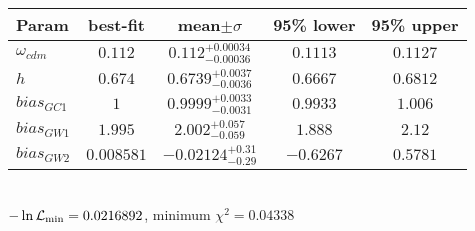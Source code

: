 \begin{tabular}{|l|c|c|c|c|} 
 \hline 
Param & best-fit & mean$\pm\sigma$ & 95\% lower & 95\% upper \\ \hline 
$\omega_{cdm }$ &$0.112$ & $0.112_{-0.00036}^{+0.00034}$ & $0.1113$ & $0.1127$ \\ 
$h$ &$0.674$ & $0.6739_{-0.0036}^{+0.0037}$ & $0.6667$ & $0.6812$ \\ 
$bias_{GC 1 }$ &$1$ & $0.9999_{-0.0031}^{+0.0033}$ & $0.9933$ & $1.006$ \\ 
$bias_{GW 1 }$ &$1.995$ & $2.002_{-0.059}^{+0.057}$ & $1.888$ & $2.12$ \\ 
$bias_{GW 2 }$ &$0.008581$ & $-0.02124_{-0.29}^{+0.31}$ & $-0.6267$ & $0.5781$ \\ 
\hline 
 \end{tabular} \\ 
$-\ln{\cal L}_\mathrm{min} =0.0216892$, minimum $\chi^2=0.04338$ \\ 
